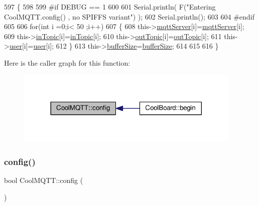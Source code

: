 \begin{DoxyCode}
597 \{
598 
599 \textcolor{preprocessor}{#if DEBUG == 1}
600 
601     Serial.println( F(\textcolor{stringliteral}{"Entering CoolMQTT.config() , no SPIFFS variant"}) );
602     Serial.println();
603 
604 \textcolor{preprocessor}{#endif}
605 
606     \textcolor{keywordflow}{for}(\textcolor{keywordtype}{int} i =0;i< 50 ;i++)
607     \{
608         this->\hyperlink{classCoolMQTT_ab8bb951f87ddbf92db74c2ad16a3e53e}{mqttServer}[i]=\hyperlink{classCoolMQTT_ab8bb951f87ddbf92db74c2ad16a3e53e}{mqttServer}[i];
609         this->\hyperlink{classCoolMQTT_a4492f52a441e83cc5151010317fdb52d}{inTopic}[i]=\hyperlink{classCoolMQTT_a4492f52a441e83cc5151010317fdb52d}{inTopic}[i];
610         this->\hyperlink{classCoolMQTT_a109c786a17b463f9eeba046194279522}{outTopic}[i]=\hyperlink{classCoolMQTT_a109c786a17b463f9eeba046194279522}{outTopic}[i];
611         this->\hyperlink{classCoolMQTT_a8cd47e45d457f908d4b4390b35aaee83}{user}[i]=\hyperlink{classCoolMQTT_a8cd47e45d457f908d4b4390b35aaee83}{user}[i];
612     \}
613     this->\hyperlink{classCoolMQTT_a7f3cf26b51d6770f216e42c5ef13ca9f}{bufferSize}=\hyperlink{classCoolMQTT_a7f3cf26b51d6770f216e42c5ef13ca9f}{bufferSize};
614     
615 
616 \}
\end{DoxyCode}
Here is the caller graph for this function\+:
\nopagebreak
\begin{figure}[H]
\begin{center}
\leavevmode
\includegraphics[width=305pt]{classCoolMQTT_a9b703de4f1358f0ee7a5e8c44979c648_icgraph}
\end{center}
\end{figure}
\mbox{\label{classCoolMQTT_a6571671781a505feca9a8a56e256c6bc}} 
\subsubsection{\texorpdfstring{config()}{config()}\hspace{0.1cm}{\footnotesize\ttfamily [2/2]}}
{\footnotesize\ttfamily bool Cool\+M\+Q\+T\+T\+::config (\begin{DoxyParamCaption}{ }\end{DoxyParamCaption})}

